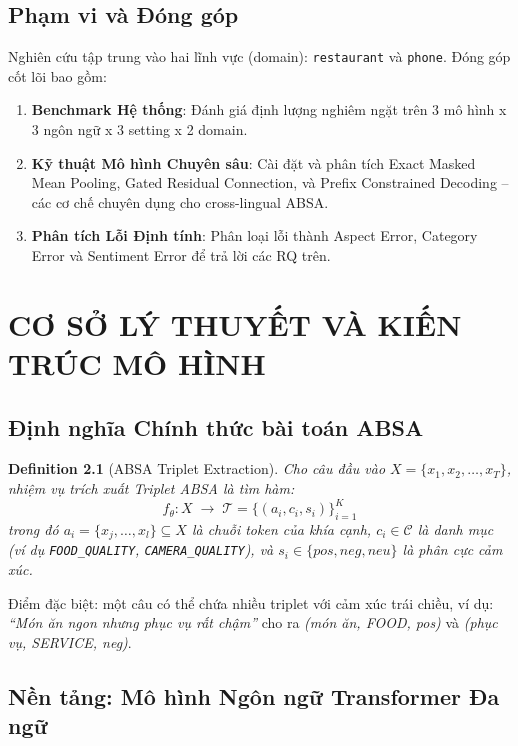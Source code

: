 \documentclass[12pt,a4paper,oneside]{report}
\newtheorem{definition}{Definition}
\begin{document}
\section{Phạm vi và Đóng góp}

Nghiên cứu tập trung vào hai lĩnh vực (domain): \texttt{restaurant} và \texttt{phone}. Đóng góp cốt lõi bao gồm:
\begin{enumerate}
    \item \textbf{Benchmark Hệ thống}: Đánh giá định lượng nghiêm ngặt trên 3 mô hình x 3 ngôn ngữ x 3 setting x 2 domain.
    \item \textbf{Kỹ thuật Mô hình Chuyên sâu}: Cài đặt và phân tích Exact Masked Mean Pooling, Gated Residual Connection, và Prefix Constrained Decoding -- các cơ chế chuyên dụng cho cross-lingual ABSA.
    \item \textbf{Phân tích Lỗi Định tính}: Phân loại lỗi thành Aspect Error, Category Error và Sentiment Error để trả lời các RQ trên.
\end{enumerate}


\chapter{CƠ SỞ LÝ THUYẾT VÀ KIẾN TRÚC MÔ HÌNH}

\section{Định nghĩa Chính thức bài toán ABSA}

\begin{definition}[ABSA Triplet Extraction]
Cho câu đầu vào $X = \{x_1, x_2, \dots, x_T\}$, nhiệm vụ trích xuất Triplet ABSA là tìm hàm:
$$f_\theta : X \;\longrightarrow\; \mathcal{T} = \{(a_i, c_i, s_i)\}_{i=1}^K$$
trong đó $a_i = \{x_j, \dots, x_l\} \subseteq X$ là chuỗi token của khía cạnh, $c_i \in \mathcal{C}$ là danh mục (ví dụ \texttt{FOOD\_QUALITY}, \texttt{CAMERA\_QUALITY}), và $s_i \in \{pos, neg, neu\}$ là phân cực cảm xúc.
\end{definition}

Điểm đặc biệt: một câu có thể chứa nhiều triplet với cảm xúc trái chiều, ví dụ: \textit{``Món ăn ngon nhưng phục vụ rất chậm''} cho ra \textit{(món ăn, FOOD, pos)} và \textit{(phục vụ, SERVICE, neg)}.

\section{Nền tảng: Mô hình Ngôn ngữ Transformer Đa ngữ}
\end{document}
